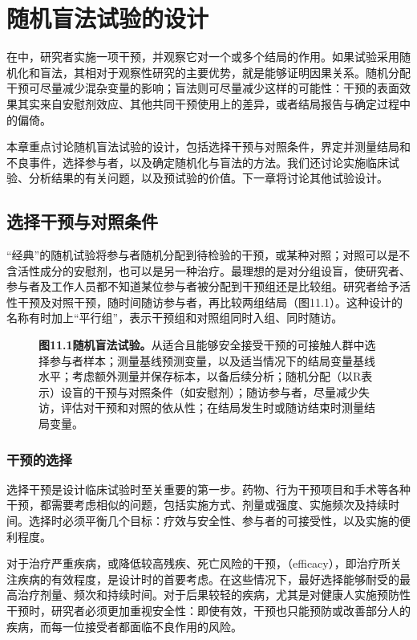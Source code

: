 \chapter{随机盲法试验的设计}
\begingroup\setlength{\tabcolsep}{4pt}
在中，研究者实施一项干预，并观察它对一个或多个结局的作用。如果试验采用随机化和盲法，其相对于观察性研究的主要优势，就是能够证明因果关系。随机分配干预可尽量减少混杂变量的影响；盲法则可尽量减少这样的可能性：干预的表面效果其实来自安慰剂效应、其他共同干预使用上的差异，或者结局报告与确定过程中的偏倚。

本章重点讨论随机盲法试验的设计，包括选择干预与对照条件，界定并测量结局和不良事件，选择参与者，以及确定随机化与盲法的方法。我们还讨论实施临床试验、分析结果的有关问题，以及预试验的价值。下一章将讨论其他试验设计。

\section{选择干预与对照条件}
“经典”的随机试验将参与者随机分配到待检验的干预，或某种对照；对照可以是不含活性成分的安慰剂，也可以是另一种治疗。最理想的是对分组设盲，使研究者、参与者及工作人员都不知道某位参与者被分配到干预组还是比较组。研究者给予活性干预及对照干预，随时间随访参与者，再比较两组结局（图11.1）。这种设计的名称有时加上“平行组”，表示干预组和对照组同时入组、同时随访。

\begin{figure}[htbp]\centering\chElevenTrial
\caption*{\textbf{图11.1\quad 随机盲法试验。}从适合且能够安全接受干预的可接触人群中选择参与者样本；测量基线预测变量，以及适当情况下的结局变量基线水平；考虑额外测量并保存标本，以备后续分析；随机分配（以R表示）设盲的干预与对照条件（如安慰剂）；随访参与者，尽量减少失访，评估对干预和对照的依从性；在结局发生时或随访结束时测量结局变量。}
\end{figure}

\subsection{干预的选择}
选择干预是设计临床试验时至关重要的第一步。药物、行为干预项目和手术等各种干预，都需要考虑相似的问题，包括实施方式、剂量或强度、实施频次及持续时间。选择时必须平衡几个目标：疗效与安全性、参与者的可接受性，以及实施的便利程度。

对于治疗严重疾病，或降低较高残疾、死亡风险的干预，（efficacy），即治疗所关注疾病的有效程度，是设计时的首要考虑。在这些情况下，最好选择能够耐受的最高治疗剂量、频次和持续时间。对于后果较轻的疾病，尤其是对健康人实施预防性干预时，研究者必须更加重视安全性：即使有效，干预也只能预防或改善部分人的疾病，而每一位接受者都面临不良作用的风险。


